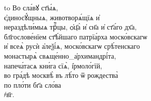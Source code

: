 \cleartorecto

\begin{center}
\hbox to %
\footnotesize
Во сла́вꙋ ст҃ы́ѧ,\\
є҆диносꙋ́щныѧ, животворѧ́щїѧ и҆\\
нераздѣли́мыѧ трⷪ҇цы, ѻ҆ц҃а̀ и҆ сн҃а и҆ ст҃а́го дх҃а,\\
бл҃гослове́нїем ст҃ѣ́йшаго патрїа́рха моско́вскагѡ\\
и҆ всеѧ̀ русѝ а҆леѯі́ѧ, моско́вскагѡ срѣ́тенскаго\\
монастырѧ̀ свѧще́нно_а҆рхимандрі́та,\\
напеча́тасѧ кни́га сїѧ̀, і҆рмоло́гїй,\\
во гра́дѣ москвѣ̀ въ лѣ́то ѿ рождества̀\\
по пло́ти бг҃а сло́ва\\
҂в҃г.
\end{center}
\thispagestyle{empty}
